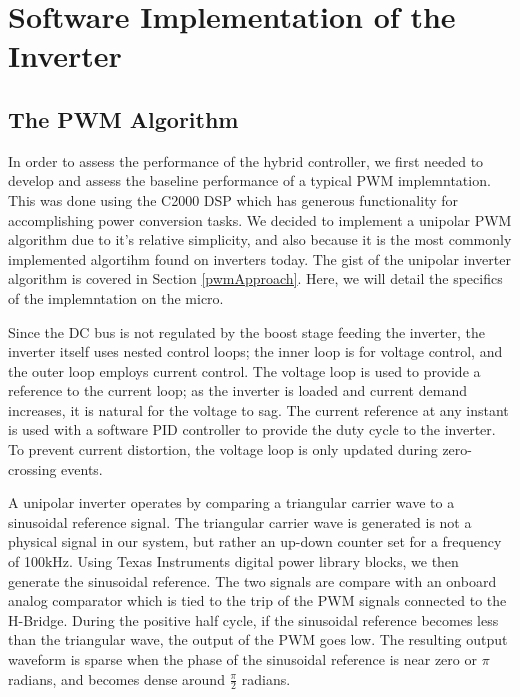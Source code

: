
\chapter{Software Implementation of the Inverter} %

\label{Chapter3} %



\section{The PWM Algorithm}
In order to assess the performance of the hybrid controller, we first needed to develop and assess the baseline performance of a typical PWM implemntation. This was done using the C2000 DSP which has generous functionality for accomplishing power conversion tasks. We decided to implement a unipolar PWM algorithm due to it's relative simplicity, and also because it is the most commonly implemented algortihm found on inverters today. The gist of the unipolar inverter algorithm is covered in Section \ref{pwmApproach}. Here, we will detail the specifics of the implemntation on the micro.

Since the DC bus is not regulated by the boost stage feeding the inverter, the inverter itself uses nested control loops; the inner loop is for voltage control, and the outer loop employs current control. The voltage loop is used to provide a reference to the current loop; as the inverter is loaded and current demand increases, it is natural for the voltage to sag. The current reference at any instant is used with a software PID controller to provide the duty cycle to the inverter. To prevent current distortion, the voltage loop is only updated during zero-crossing events.

A unipolar inverter operates by comparing a triangular carrier wave to a sinusoidal reference signal. The triangular carrier wave is generated is not a physical signal in our system, but rather an up-down counter set for a frequency of 100kHz. Using Texas Instruments digital power library blocks, we then generate the sinusoidal reference. The two signals are compare with an onboard analog comparator which is tied to the trip of the PWM signals connected to the H-Bridge. During the positive half cycle, if the sinusoidal reference becomes less than the triangular wave, the output of the PWM goes low. The resulting output waveform is sparse when the phase of the sinusoidal reference is near zero or $\pi$ radians, and becomes dense around $\frac{\pi}{2}$ radians. 

